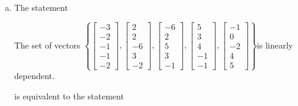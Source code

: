 \begin{exerciseAnswer}
\begin{enumerate}[(a)]
\item The statement 
\begin{center}\begin{minipage}{0.8\textwidth}
 The set of vectors \( \left\{ \left[\begin{array}{c}
-3 \\
-2 \\
-1 \\
-1 \\
-2
\end{array}\right] , \left[\begin{array}{c}
2 \\
2 \\
-6 \\
3 \\
-2
\end{array}\right] , \left[\begin{array}{c}
-6 \\
2 \\
5 \\
3 \\
-1
\end{array}\right] , \left[\begin{array}{c}
5 \\
3 \\
4 \\
-1 \\
-1
\end{array}\right] , \left[\begin{array}{c}
-1 \\
0 \\
-2 \\
4 \\
5
\end{array}\right] \right\} \)is linearly dependent.
\end{minipage}\end{center}
     is equivalent to the statement 
\begin{center}\begin{minipage}{0.8\textwidth}
 The vector equation \( x_{1} \left[\begin{array}{c}
-3 \\
-2 \\
-1 \\
-1 \\
-2
\end{array}\right] + x_{2} \left[\begin{array}{c}
2 \\
2 \\

\end{array}
\end{minipage}
\end{center}
\end{enumerate}
\end{exerciseAnswer}
